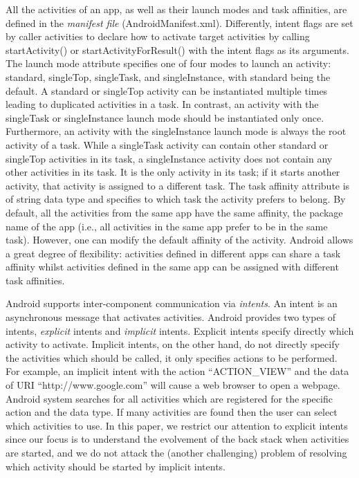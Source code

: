  All the activities of an app, as well as their launch modes and task affinities, are defined in the \emph{manifest file}  
 ({\sf AndroidManifest.xml}). Differently, intent flags are set by caller activities to declare how to activate target activities by calling startActivity() or startActivityForResult() with the intent flags as its arguments. The launch mode attribute  specifies one of four modes to launch an activity: standard, singleTop, singleTask, and singleInstance, with standard being the default. A standard or singleTop activity can be instantiated multiple times leading to duplicated activities in a task. In contrast, an activity with the singleTask or singleInstance launch mode should be instantiated only once. Furthermore, an activity with the singleInstance launch mode is always the root activity of a task. While a singleTask activity
 can contain other standard or singleTop activities in its task, a singleInstance activity does not contain any other
 activities in its task. It is the only activity in its task; if it starts another activity, that activity is assigned to a different task. 
The task affinity attribute is of string data type and specifies to which task the activity prefers to belong. By default, all the activities from the same app have the same affinity, the package name of the app (i.e., all activities in the same app prefer to be in the same task). However, one can modify the default affinity of the activity. Android allows a great degree of flexibility: activities defined in different apps can share a task affinity whilst activities defined in the same app can be assigned with different task affinities.  

 
Android supports inter-component communication via \emph{intents}. An intent is an asynchronous message that activates activities. 
Android provides two types of intents, \emph{explicit} intents and \emph{implicit} intents. 
Explicit intents specify directly which activity to activate. Implicit intents, on the other hand, do not directly specify the activities which should be called, it only specifies actions to be performed. 
For example, an implicit intent with the action ``ACTION\_VIEW'' and the data of  URI ``http://www.google.com'' will cause a web browser to open a webpage. 
Android system searches for all activities which are registered for the specific action and the data type. If many activities are found then the user can select which activities to use.
In this paper, we restrict our attention to explicit intents since our focus is to understand the evolvement of the back stack when activities are started, and we do not attack the (another challenging) problem of resolving which activity should be started by implicit intents. 

